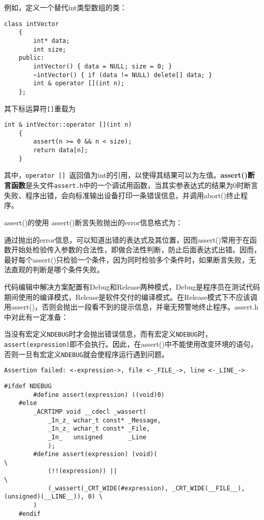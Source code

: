 \documentclass[10pt, a4paper, oneside, fontset=none]{ctexart}
\theoremstyle{plain}
\theoremstyle{definition}
\newcommand{\colors}[1]{\color{#1!75!black}}
\newcommand{\zhu}[2][]{\begin{note}{#1}\xiu #2\end{note}}
\begin{document}
例如，定义一个替代int类型数组的类：
\begin{lstlisting}[name=intVector, 
	moreemph={intVector}, emphstyle=\colors{qinglv}, moreemph={[2]{data, size, n}}, emphstyle={[2]\it\ttfamily},
	morekeywords={delete[]}
]
	class intVector
	{
		int* data;
		int size;
	public:
		intVector() { data = NULL; size = 0; }
		~intVector() { if (data != NULL) delete[] data; }
		int & operator [](int n);
	};
\end{lstlisting}
其下标运算符\texttt{[]}重载为 
\begin{lstlisting}[name=intVector, 
	moreemph={intVector}, emphstyle=\colors{qinglv}, moreemph={[2]{data, size, n}}, emphstyle={[2]\it\ttfamily},
	morekeywords={delete[]}
]
	int & intVector::operator [](int n)
	{
		assert(n >= 0 && n < size);
		return data[n];
	}
\end{lstlisting}
其中，\lstinline{operator []}~返回值为int的引用，以使得其结果可以为左值。\textbf{assert()断言函数}是头文件\texttt{assert.h}中的一个调试用函数，当其实参表达式的结果为0时断言失败、程序出错，会向标准输出设备打印一条错误信息，并调用abort()终止程序。

\zhu[assert()的使用]{
	assert()断言失败抛出的error信息格式为：
	\vspace{2.5\baselineskip}

	通过抛出的error信息，可以知道出错的表达式及其位置，因而assert()常用于在函数开始处检验传入参数的合法性，即做合法性判断，防止后面表达式出错。因而，最好每个assert()只检验一个条件，因为同时检验多个条件时，如果断言失败，无法直观的判断是哪个条件失败。

	代码编辑中解决方案配置有Debug和Release两种模式，Debug是程序员在测试代码期间使用的编译模式，Release是软件交付的编译模式。在Release模式下不应该调用assert()，否则会抛出一段看不到的提示信息，并毫无预警地终止程序。assert.h中对此有一定准备：
	\vspace{11.7\baselineskip}

	当没有宏定义\texttt{NDEBUG}时才会抛出错误信息，而有宏定义\texttt{NDEBUG}时，\texttt{assert(expression)}即不会执行。因此，在assert()中不能使用改变环境的语句，否则一旦有宏定义\texttt{NDEBUG}就会使程序运行遇到问题。
}

\vspace{-23.2\baselineskip}
\begin{lstlisting}[style=output, xleftmargin=3.5em, xrightmargin=2.5em]
	Assertion failed: <-expression->, file <-_FILE_->, line <-_LINE_->
\end{lstlisting}
\vspace{5.7\baselineskip}
\begin{lstlisting}[style=notec, morekeywords={\#define}]
	#ifdef NDEBUG
    	#define assert(expression) ((void)0)
	#else
		_ACRTIMP void __cdecl _wassert(
			_In_z_ wchar_t const* _Message,
			_In_z_ wchar_t const* _File,
			_In_   unsigned       _Line
			);
		#define assert(expression) (void)(                                                       \
            (!!(expression)) ||                                                              \
            (_wassert(_CRT_WIDE(#expression), _CRT_WIDE(__FILE__), (unsigned)(__LINE__)), 0) \
        )
	#endif
\end{lstlisting}
\vspace{3\baselineskip}
\end{document}
